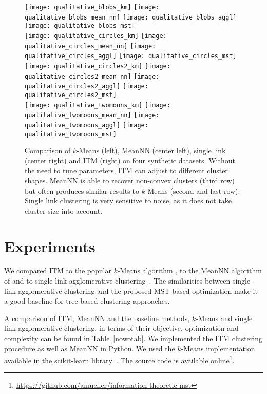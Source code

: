 \begin{figure}[t]
\centering
\texttt{[image: qualitative\_blobs\_km]}
\texttt{[image: qualitative\_blobs\_mean\_nn]}
\texttt{[image: qualitative\_blobs\_aggl]}
\texttt{[image: qualitative\_blobs\_mst]} \\ 

\texttt{[image: qualitative\_circles\_km]}
\texttt{[image: qualitative\_circles\_mean\_nn]}
\texttt{[image: qualitative\_circles\_aggl]}
\texttt{[image: qualitative\_circles\_mst]} \\ 

\texttt{[image: qualitative\_circles2\_km]}
\texttt{[image: qualitative\_circles2\_mean\_nn]}
\texttt{[image: qualitative\_circles2\_aggl]}
\texttt{[image: qualitative\_circles2\_mst]} \\ 

\texttt{[image: qualitative\_twomoons\_km]}
\texttt{[image: qualitative\_twomoons\_mean\_nn]}
\texttt{[image: qualitative\_twomoons\_aggl]}
\texttt{[image: qualitative\_twomoons\_mst]} \\ 
\caption{Comparison of $k$-Means (left), MeanNN (center left), single link
(center right) and ITM (right) on four synthetic datasets.  Without the need to
tune parameters, ITM can adjust to different cluster shapes.  MeanNN is able to
recover non-convex clusters (third row) but often produces similar results to
$k$-Means (second and last row). Single link clustering is very sensitive
to noise, as it does not take cluster size into account.}
\label{fig:qualitative}
\end{figure}

\section{Experiments}
We compared ITM to the popular $k$-Means algorithm 
\citep{macqueen1967some,lloyd1982least}, to the MeanNN algorithm of
\citet{faivishevsky2010nonparametric} and to single-link agglomerative
clustering~\citep{gower1969minimum}. The similarities between single-link
agglomerative clustering and the proposed MST-based optimization make it a 
good baseline for tree-based clustering approaches.

A comparison of ITM, MeanNN and the baseline methods, $k$-Means and 
single link agglomerative clustering, in terms of their objective, 
optimization and complexity can be found in Table~\ref{nowotab}. 
We implemented the ITM clustering procedure as well as MeanNN in Python.  We
used the $k$-Means implementation available in the scikit-learn
library~\citep{pedregosa2011scikit}. The source
code is available online\footnote{\url{https://github.com/amueller/information-theoretic-mst}}.

